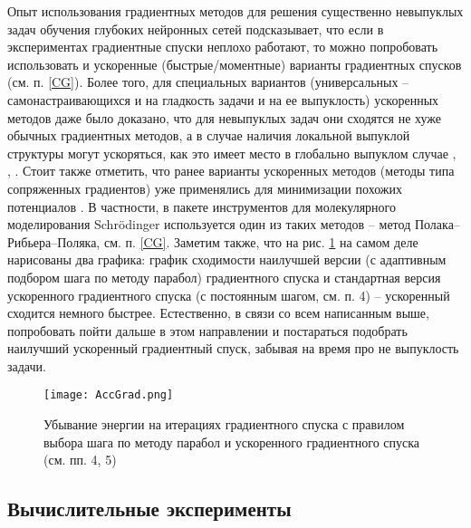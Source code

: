   Опыт использования градиентных методов для решения существенно невыпуклых задач обучения глубоких нейронных сетей \cite{Goodfellow2017} подсказывает, что если в экспериментах градиентные спуски неплохо работают, то можно попробовать использовать и ускоренные (быстрые/моментные) варианты градиентных спусков (см. п. \ref{CG}). Более того, для специальных вариантов (универсальных -- самонастраивающихся и на гладкость задачи и на ее выпуклость) ускоренных методов даже было доказано, что для невыпуклых задач они сходятся не хуже обычных градиентных методов, а в случае наличия локальной выпуклой структуры могут ускоряться, как это имеет место в глобально выпуклом случае \cite{ghadimi2015generalized}, \cite{guminov2019accelerated}, \cite{guminov2019universal}. Стоит также отметить, что ранее варианты ускоренных методов (методы типа сопряженных градиентов) уже применялись для минимизации похожих потенциалов \cite{wales1997global}. В частности, в пакете инструментов для молекулярного моделирования Schrödinger \cite{sastry2013protein} используется один из таких методов -- метод Полака--Рибьера--Поляка, см. п. \ref{CG}. Заметим также, что на рис. \ref{AG} на самом деле нарисованы два графика: график сходимости наилучшей версии (с адаптивным подбором шага по методу парабол) градиентного спуска и стандартная версия ускоренного градиентного спуска (с постоянным шагом, см. п. 4) -- ускоренный сходится немного быстрее. Естественно, в связи со всем написанным выше, попробовать пойти дальше в этом направлении и постараться подобрать наилучший ускоренный градиентный спуск, забывая на время про не выпуклость задачи. 

  \begin{figure}
  \begin{center}
  \texttt{[image: AccGrad.png]}
  \end{center}
  \caption{Убывание энергии на итерациях градиентного спуска с правилом выбора шага по методу парабол и ускоренного градиентного спуска (см. пп. 4, 5)}
   \label{AG}
  \end{figure}


\subsection{Вычислительные эксперименты } \label{subsec:sec1/su5}

